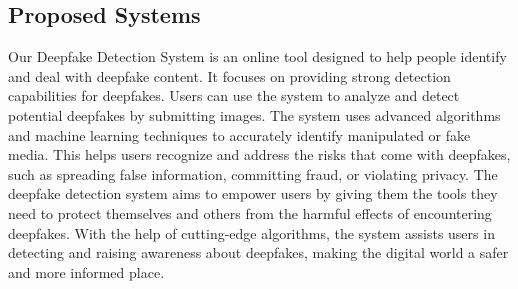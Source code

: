 \subsection{Proposed Systems}
Our Deepfake Detection System is an online tool designed to help people identify and deal with deepfake content. It focuses on providing strong detection capabilities for deepfakes. Users can use the system to analyze and detect potential deepfakes by submitting images. The system uses advanced algorithms and machine learning techniques to accurately identify manipulated or fake media. This helps users recognize and address the risks that come with deepfakes, such as spreading false information, committing fraud, or violating privacy. The deepfake detection system aims to empower users by giving them the tools they need to protect themselves and others from the harmful effects of encountering deepfakes. With the help of cutting-edge algorithms, the system assists users in detecting and raising awareness about deepfakes, making the digital world a safer and more informed place.
